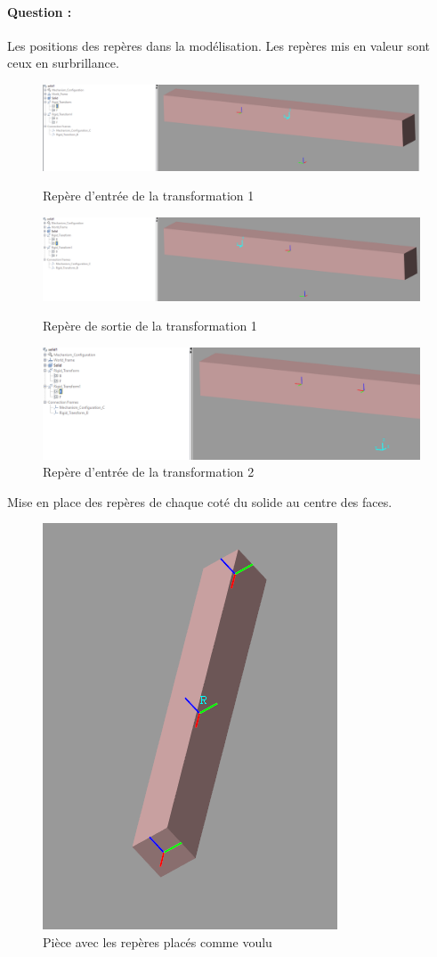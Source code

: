\documentclass[12pt,a4paper]{article}
\begin{document}
\paragraph{Question : } Les positions des repères dans la modélisation.
Les repères mis en valeur sont ceux en surbrillance.

\begin{figure}[h!]
\centering 
\includegraphics[width=.9\linewidth]{r1.png}
\caption{Repère d'entrée de la transformation 1}
\includegraphics[width=.9\linewidth]{r2.png}
\caption{Repère de sortie de la transformation 1}
\includegraphics[width=.9\linewidth]{r3.png}
\caption{Repère d'entrée de la transformation 2}
\end{figure}
\newpage
Mise en place des repères de chaque coté du solide au centre des faces.
\begin{figure}[h!]
\centering
\includegraphics[scale=.9]{r4.png}
\caption{Pièce avec les repères placés comme voulu}
\end{figure}
\end{document}
